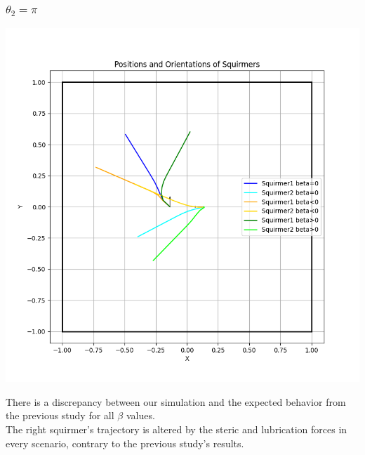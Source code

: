 \documentclass{article}
\begin{document}
\subsubsection{$\theta_2 = \pi$}
\begin{center}
   \includegraphics[width=1\textwidth]{graphs/simulations/twosquirmerinter/sq2.pi.png}
\end{center}
There is a discrepancy between our simulation and the expected behavior from the previous study for all $\beta$ values.\\
The right squirmer's trajectory is altered by the steric and lubrication forces in every scenario, 
contrary to the previous study's results.
\end{document}

